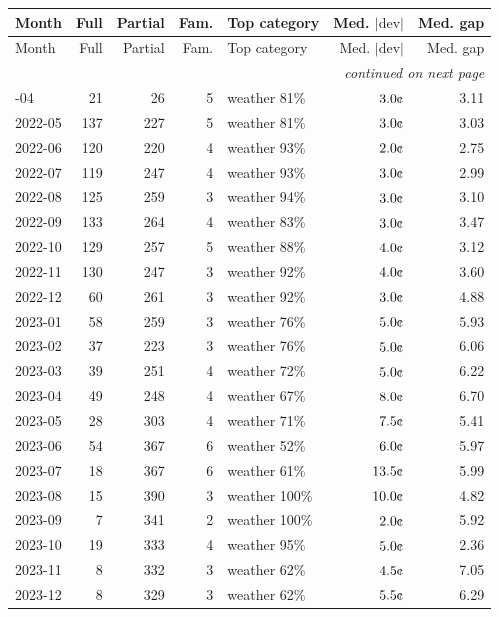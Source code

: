 \documentclass[11pt,a4paper]{article}
\newcommand{\cent}{\text{\textcent}}
\begin{document}
{\footnotesize
\begin{longtable}{lrrrlrr}
\toprule
Month & Full & Partial & Fam. & Top category & Med. $|\mathrm{dev}|$ & Med. gap \\
\midrule
\endfirsthead
\toprule
Month & Full & Partial & Fam. & Top category & Med. $|\mathrm{dev}|$ & Med. gap \\
\midrule
\endhead
\midrule \multicolumn{7}{r}{\emph{continued on next page}} \\
\endfoot
\bottomrule
\endlastfoot
2022-04 & 21 & 26 & 5 & weather 81\% & $3.0\cent$ & 3.11 \\
2022-05 & 137 & 227 & 5 & weather 81\% & $3.0\cent$ & 3.03 \\
2022-06 & 120 & 220 & 4 & weather 93\% & $2.0\cent$ & 2.75 \\
2022-07 & 119 & 247 & 4 & weather 93\% & $3.0\cent$ & 2.99 \\
2022-08 & 125 & 259 & 3 & weather 94\% & $3.0\cent$ & 3.10 \\
2022-09 & 133 & 264 & 4 & weather 83\% & $3.0\cent$ & 3.47 \\
2022-10 & 129 & 257 & 5 & weather 88\% & $4.0\cent$ & 3.12 \\
2022-11 & 130 & 247 & 3 & weather 92\% & $4.0\cent$ & 3.60 \\
\midrule
2022-12 & 60 & 261 & 3 & weather 92\% & $3.0\cent$ & 4.88 \\
2023-01 & 58 & 259 & 3 & weather 76\% & $5.0\cent$ & 5.93 \\
2023-02 & 37 & 223 & 3 & weather 76\% & $5.0\cent$ & 6.06 \\
2023-03 & 39 & 251 & 4 & weather 72\% & $5.0\cent$ & 6.22 \\
2023-04 & 49 & 248 & 4 & weather 67\% & $8.0\cent$ & 6.70 \\
2023-05 & 28 & 303 & 4 & weather 71\% & $7.5\cent$ & 5.41 \\
2023-06 & 54 & 367 & 6 & weather 52\% & $6.0\cent$ & 5.97 \\
2023-07 & 18 & 367 & 6 & weather 61\% & $13.5\cent$ & 5.99 \\
2023-08 & 15 & 390 & 3 & weather 100\% & $10.0\cent$ & 4.82 \\
2023-09 & 7 & 341 & 2 & weather 100\% & $2.0\cent$ & 5.92 \\
2023-10 & 19 & 333 & 4 & weather 95\% & $5.0\cent$ & 2.36 \\
2023-11 & 8 & 332 & 3 & weather 62\% & $4.5\cent$ & 7.05 \\
2023-12 & 8 & 329 & 3 & weather 62\% & $5.5\cent$ & 6.29 \\

\end{longtable}}
\end{document}
